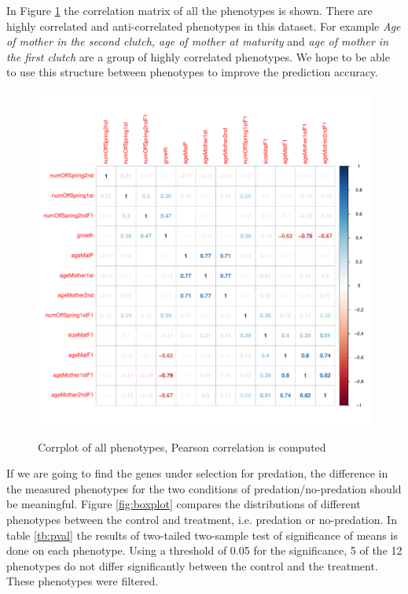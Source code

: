 \documentclass[a4paper]{article}
\begin{document}
In Figure \ref{fig:corrplot} the correlation matrix of all the phenotypes is shown. There are highly correlated and anti-correlated phenotypes in this dataset. For example \textit{Age of mother in the second clutch, age of mother at maturity} and \textit{age of mother in the first clutch} are a group of highly correlated phenotypes. We hope to be able to use this structure between phenotypes to improve the prediction accuracy.\\


\begin{figure}

\centering
\includegraphics[width=1\textwidth]{corrplotPhenotype.pdf}
\label{fig:corrplot}
\caption{Corrplot of all phenotypes, Pearson correlation is computed}
\end{figure}

If we are going to find the genes under selection for predation, the difference in the measured phenotypes for the two conditions of predation/no-predation should be meaningful. Figure \ref{fig:boxplot} compares the distributions of different phenotypes between the control and treatment, i.e. predation or no-predation. In table \ref{tb:pval} the results of two-tailed two-sample test of significance of means is done on each phenotype. Using a threshold of 0.05 for the significance, 5 of the 12 phenotypes do not differ significantly between the control and the treatment. These phenotypes were filtered.
\end{document}
